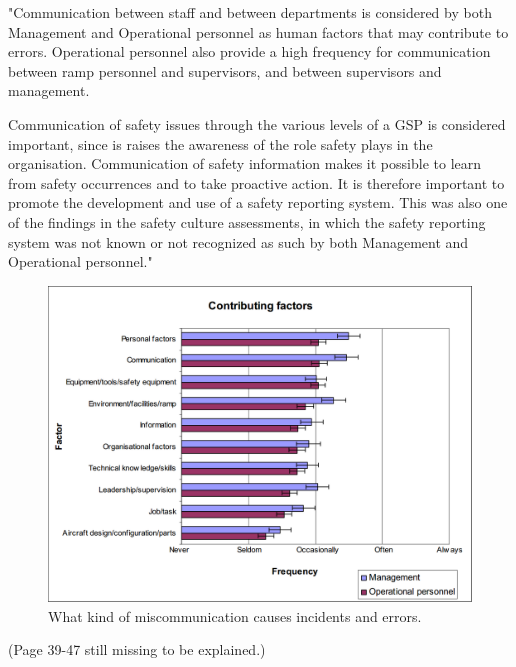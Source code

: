"Communication between staff and between departments is considered by both Management and Operational personnel as human factors that may contribute to errors. Operational personnel also provide a high frequency for communication between ramp personnel and supervisors, and between supervisors and management. 

Communication of safety issues through the various levels of a GSP is considered important, since is raises the awareness of the role safety plays in the organisation. Communication of safety information makes it possible to learn from safety occurrences and to take proactive action. It is therefore important to promote the development and use of a safety reporting system. This was also one of the findings in the safety culture assessments, in which the safety reporting system was not known or not recognized as such by both Management and Operational personnel."

\begin{figure}
\centering
\includegraphics[width=\textwidth]{Grafik/ContributingFactors}
\caption{What kind of miscommunication causes incidents and errors.}
\label{ContributingFactors}
\end{figure}

(Page 39-47 still missing to be explained.)
